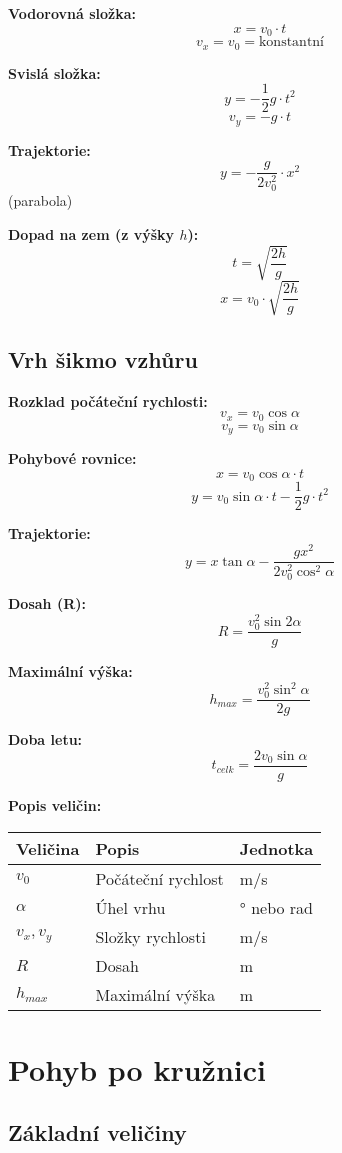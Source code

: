 \documentclass[11pt,a4paper]{article}
\begin{document}
\textbf{Vodorovná složka:}
\[x = v_0 \cdot t\]
\[v_x = v_0 = \text{konstantní}\]

\textbf{Svislá složka:}
\[y = -\frac{1}{2} g \cdot t^2\]
\[v_y = -g \cdot t\]

\textbf{Trajektorie:}
\[y = -\frac{g}{2v_0^2} \cdot x^2\] (parabola)

\textbf{Dopad na zem (z výšky $h$):}
\[t = \sqrt{\frac{2h}{g}}\]
\[x = v_0 \cdot \sqrt{\frac{2h}{g}}\]

\subsection{Vrh šikmo vzhůru}

\textbf{Rozklad počáteční rychlosti:}
\[v_x = v_0 \cos \alpha\]
\[v_y = v_0 \sin \alpha\]

\textbf{Pohybové rovnice:}
\[x = v_0 \cos \alpha \cdot t\]
\[y = v_0 \sin \alpha \cdot t - \frac{1}{2} g \cdot t^2\]

\textbf{Trajektorie:}
\[y = x \tan \alpha - \frac{g x^2}{2 v_0^2 \cos^2 \alpha}\]

\textbf{Dosah (R):}
\[R = \frac{v_0^2 \sin 2\alpha}{g}\]

\textbf{Maximální výška:}
\[h_{max} = \frac{v_0^2 \sin^2 \alpha}{2g}\]

\textbf{Doba letu:}
\[t_{celk} = \frac{2v_0 \sin \alpha}{g}\]

\textbf{Popis veličin:}

\begin{longtable}{lll}
\toprule
Veličina & Popis & Jednotka \\
\midrule
$v_0$ & Počáteční rychlost & m/s \\
$\alpha$ & Úhel vrhu & ° nebo rad \\
$v_x, v_y$ & Složky rychlosti & m/s \\
$R$ & Dosah & m \\
$h_{max}$ & Maximální výška & m \\
\bottomrule
\end{longtable}

\clearpage

\section{Pohyb po kružnici}

\subsection{Základní veličiny}
\end{document}
